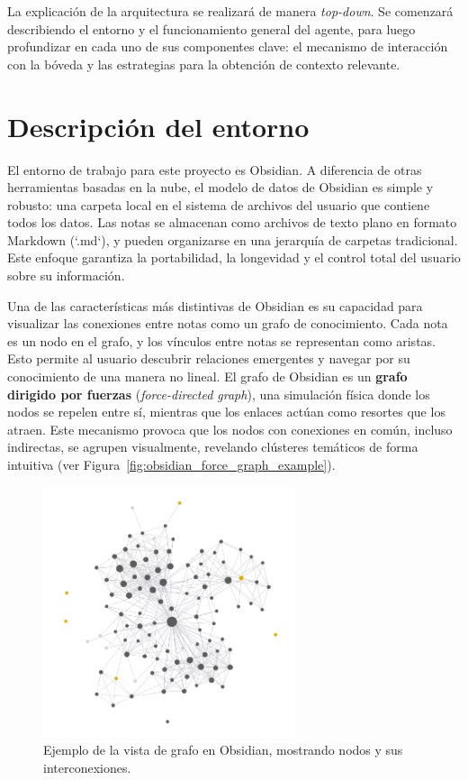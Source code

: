 La explicación de la arquitectura se realizará de manera \textit{top-down}. Se comenzará describiendo el entorno y el funcionamiento general del agente, para luego profundizar en cada uno de sus componentes clave: el mecanismo de interacción con la bóveda y las estrategias para la obtención de contexto relevante.

\section{Descripción del entorno}
El entorno de trabajo para este proyecto es Obsidian. A diferencia de otras herramientas basadas en la nube, el modelo de datos de Obsidian es simple y robusto: una carpeta local en el sistema de archivos del usuario que contiene todos los datos. Las notas se almacenan como archivos de texto plano en formato Markdown (`.md`), y pueden organizarse en una jerarquía de carpetas tradicional. Este enfoque garantiza la portabilidad, la longevidad y el control total del usuario sobre su información.

Una de las características más distintivas de Obsidian es su capacidad para visualizar las conexiones entre notas como un grafo de conocimiento. Cada nota es un nodo en el grafo, y los vínculos entre notas se representan como aristas. Esto permite al usuario descubrir relaciones emergentes y navegar por su conocimiento de una manera no lineal. El grafo de Obsidian es un \textbf{grafo dirigido por fuerzas} (\textit{force-directed graph}), una simulación física donde los nodos se repelen entre sí, mientras que los enlaces actúan como resortes que los atraen. Este mecanismo provoca que los nodos con conexiones en común, incluso indirectas, se agrupen visualmente, revelando clústeres temáticos de forma intuitiva (ver Figura~\ref{fig:obsidian_force_graph_example}).

\begin{figure}[h]
    \centering
    \includegraphics[width=0.66\textwidth]{figures/obsidian_kg_example.png}
    \caption{Ejemplo de la vista de grafo en Obsidian, mostrando nodos y sus interconexiones.}
    \label{fig:obsidian_graph}
\end{figure}

